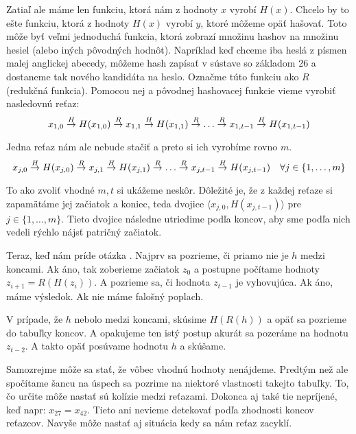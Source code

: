 Zatiaľ ale máme len funkciu, ktorá nám z hodnoty $x$ vyrobí $H(x)$.
Chcelo by to ešte funkciu, ktorá z hodnoty $H(x)$ vyrobí $y$,
ktoré môžeme opäť hašovať.
Toto môže byť veľmi jednoduchá funkcia,
ktorá zobrazí množinu hashov na množinu hesiel (alebo iných pôvodných hodnôt).
Napríklad keď chceme iba heslá z písmen malej anglickej abecedy,
môžeme hash zapísať v sústave so základom 26 a dostaneme tak nového
kandidáta na heslo.
Označme túto funkciu ako $R$ (redukčná funkcia).
Pomocou nej a pôvodnej hashovacej funkcie vieme vyrobiť nasledovnú reťaz:
\begin{equation*}
    x_{1,0} \toa{H} H(x_{1,0}) \toa{R} 
    x_{1,1} \toa{H} H(x_{1,1}) \toa{R} \dots \toa{R} 
    x_{1,t-1} \toa{H} H(x_{1,t-1})
\end{equation*}

\noindent
Jedna reťaz nám ale nebude stačiť a preto si ich vyrobíme rovno $m$.
\begin{equation*}
    x_{j,0} \toa{H} H(x_{j,0}) \toa{R}
    x_{j,1} \toa{H} H(x_{j,1}) \toa{R} \dots \toa{R}
    x_{j,t-1} \toa{H} H(x_{j,t-1})
    \quad \forall j \in \{1,\dots,m\}
\end{equation*}

To ako zvoliť vhodné $m, t$ si ukážeme neskôr.
Dôležité je, že z každej reťaze si zapamätáme jej začiatok a koniec,
teda dvojice
$\langle x_{j,0}, H(x_{j,t-1})\rangle$ pre $j \in \{1,\dots,m\}$.
Tieto dvojice následne utriedime podľa koncov,
aby sme podľa nich vedeli rýchlo nájsť patričný začiatok.

\medskip
Teraz, keď nám príde otázka .
Najprv sa pozrieme, či priamo nie je $h$ medzi koncami.
Ak áno, tak zoberieme začiatok $z_0$ a postupne počítame hodnoty
$z_{i+1} = R(H(z_i))$.
A pozrieme sa, či hodnota $z_{t-1}$ je vyhovujúca.
Ak áno, máme výsledok. Ak nie máme falošný poplach.

V prípade, že $h$ nebolo medzi koncami, skúsime $H(R(h))$
a opäť sa pozrieme do tabuľky koncov.
A opakujeme ten istý postup akurát sa pozeráme na hodnotu $z_{t-2}$.
A takto opäť posúvame hodnotu $h$ a skúšame.

Samozrejme môže sa stať, že vôbec vhodnú hodnoty nenájdeme.
Predtým než ale spočítame šancu na úspech sa pozrime
na niektoré vlastnosti takejto tabuľky.
To, čo určite môže nastať sú kolízie medzi reťazami.
Dokonca aj také tie nepríjené, keď napr: $x_{27} = x_{42}$.
Tieto ani nevieme detekovať podľa zhodnosti koncov reťazcov.
Navyše môže nastať aj situácia kedy sa nám reťaz zacyklí. 

